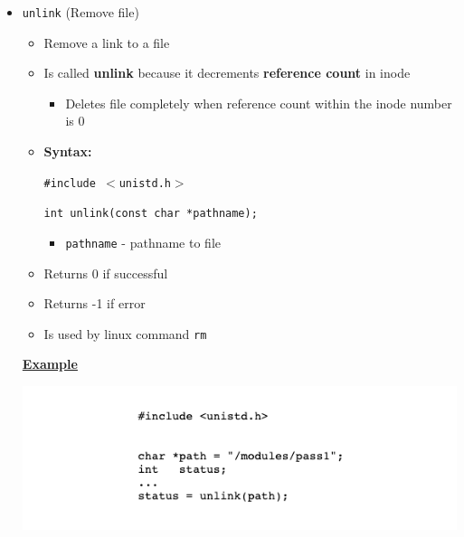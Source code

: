 \documentclass[12pt]{article}
\begin{document}
\begin{enumerate}[1.]
\begin{enumerate}[a)]
\begin{itemize}
            \item \texttt{unlink} (Remove file)

            \begin{itemize}
                \item Remove a link to a file
                \item Is called \textbf{unlink} because it decrements \textbf{reference count} in inode
                \begin{itemize}
                    \item Deletes file completely when reference count within the inode number is 0
                \end{itemize}
                \item \textbf{Syntax:}

                \bigskip
                \texttt{\#include $<$unistd.h$>$}

                \bigskip

                \texttt{int unlink(const char *pathname);}

                \bigskip

                \begin{itemize}
                    \item \texttt{pathname} - pathname to file
                \end{itemize}
                \item Returns 0 if successful
                \item Returns -1 if error
                \item Is used by linux command \texttt{rm}
            \end{itemize}

            \bigskip

            \underline{\textbf{Example}}

            \begin{center}
            \includegraphics[width=\linewidth]{../images/midterm_4_solution_17.png}
            \end{center}
        \end{itemize}


\end{enumerate}
\end{enumerate}
\end{document}
